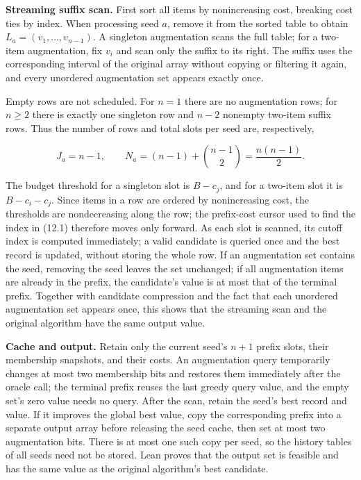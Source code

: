 \documentclass[11pt,a4paper]{article}
\begin{document}
\textbf{Streaming suffix scan.} First sort all items by nonincreasing cost, breaking cost ties by index. When processing seed $a$, remove it from the sorted table to obtain $L_a=(v_1,\ldots,v_{n-1})$. A singleton augmentation scans the full table; for a two-item augmentation, fix $v_i$ and scan only the suffix to its right. The suffix uses the corresponding interval of the original array without copying or filtering it again, and every unordered augmentation set appears exactly once.

Empty rows are not scheduled. For $n=1$ there are no augmentation rows; for $n\ge2$ there is exactly one singleton row and $n-2$ nonempty two-item suffix rows. Thus the number of rows and total slots per seed are, respectively,

\[
J_a=n-1,\qquad
N_a=(n-1)+\binom{n-1}{2}=\frac{n(n-1)}2.
\]

The budget threshold for a singleton slot is $B-c_j$, and for a two-item slot it is $B-c_i-c_j$. Since items in a row are ordered by nonincreasing cost, the thresholds are nondecreasing along the row; the prefix-cost cursor used to find the index in (12.1) therefore moves only forward. As each slot is scanned, its cutoff index is computed immediately; a valid candidate is queried once and the best record is updated, without storing the whole row. If an augmentation set contains the seed, removing the seed leaves the set unchanged; if all augmentation items are already in the prefix, the candidate's value is at most that of the terminal prefix. Together with candidate compression and the fact that each unordered augmentation set appears once, this shows that the streaming scan and the original algorithm have the same output value.

\textbf{Cache and output.} Retain only the current seed's $n+1$ prefix slots, their membership snapshots, and their costs. An augmentation query temporarily changes at most two membership bits and restores them immediately after the oracle call; the terminal prefix reuses the last greedy query value, and the empty set's zero value needs no query. After the scan, retain the seed's best record and value. If it improves the global best value, copy the corresponding prefix into a separate output array before releasing the seed cache, then set at most two augmentation bits. There is at most one such copy per seed, so the history tables of all seeds need not be stored. Lean proves that the output set is feasible and has the same value as the original algorithm's best candidate.
\end{document}
